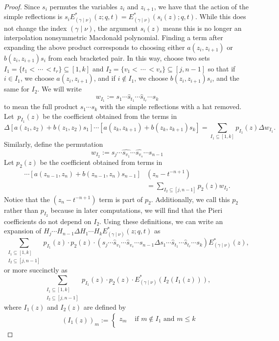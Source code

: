 \documentclass[11pt]{article}
\theoremstyle{definition}
\numberwithin{equation}{section}
\newcommand{\shatproduct}{s_1 \dotsm \widehat{s}_{t_1} \dotsm \widehat{s}_{t_r} \dotsm s_k}
\newcommand{\Estar}[1]{E^*_{#1}}
\newcommand{\Estarlong}[1]{E^*_{#1}(z;q,t)}
\newcommand{\gammanu}{{(\gamma \mid \nu)}}
\begin{document}
\begin{proof}
Since $s_i$ permutes the variables $z_i$ and $z_{i+1}$, we have that the action of the simple reflections is $s_i\Estarlong{\gammanu} = \Estar{\gammanu}(s_i(z);q,t)$. While this does not change the index $\gammanu$, the argument $s_i(z)$ means this is no longer an interpolation nonsymmetric Macdonald polynomial. Finding a term after expanding the above product corresponds to choosing either $a(z_i,z_{i+1})$ or $b(z_i,z_{i+1}) s_i$ from each bracketed pair. In this way, choose two sets $I_1=\{t_1< \, \dotsm \, < t_r\} \subseteq [1,k]$ and $I_2=\{v_1< \, \dotsm \, < v_s\} \subseteq [j,n-1]$ so that if $i\in I_1$, we choose $a(z_i,z_{i+1})$, and if $i\notin I_1$, we choose $b(z_i,z_{i+1})s_i$, and the same for $I_2$. We will write
\[ w_{I_1} := \shatproduct \]
to mean the full product $s_1 \dotsm s_k$ with the simple reflections with a hat removed. Let~$p_{I_1}(z)$ be the coefficient obtained from the terms in
\[ \Delta [a(z_1, z_2)+b(z_1,z_2) s_1] \dotsm [a(z_k,z_{k+1}) + b(z_k,z_{k+1})s_k] = \sum_{I_1\subseteq [1,k]} p_{I_1}(z) \Delta w_{I_1}.\]
Similarly, define the permutation
\[w_{I_2} := s_j \dotsm \widehat{s_{v_1}} \dotsm \widehat{s_{v_s}} \dotsm s_{n-1} \]
Let $p_{2}(z)$  be the coefficient obtained from terms in
\begin{align*} [a(z_j,z_{j+1})+b(z_j,z_{j+1}) s_j] \dotsm [a(z_{n-1},z_n)+b(z_{n-1},z_n) s_{n-1}] &(z_n-t^{-n+1})\\ &=\sum_{I_2\subseteq[j,n-1]}p_2(z)w_{I_2}.\end{align*}
Notice that the $(z_n-t^{-n+1})$ term is part of $p_2$. Additionally, we call this $p_2$ rather than $p_{I_2}$ because in later computations, we will find that the Pieri coefficients do not depend on $I_2$. Using these definitions, we can write an expansion of $\displaystyle{H_j \dotsm H_{n-1} \Delta H_1 \dotsm H_k  \Estarlong{\gammanu}}$ as
\begin{equation}\label{Expandedright}
      \sum\limits_{\substack{I_1 \subseteq [1,k] \\ I_2 \subseteq [j, n-1]}} p_{I_1}(z) \cdot p_2(z)  \cdot \left( s_j \dotsm \widehat{s}_{v_1} \dotsm \widehat{s}_{v_s} \dotsm s_{n-1}\Delta \shatproduct \right) \Estar{\gammanu}(z), \end{equation}
or more succinctly as
   \[ \sum\limits_{\substack{I_1 \subseteq [1,k] \\ I_2 \subseteq [j, n-1]}} p_{I_1}(z) \cdot p_2(z)  \cdot \Estar{\gammanu}(I_2(I_1(z))),
\]
where $I_1(z)$ and $I_2(z)$ are defined by
\begin{align} \label{Ione}&(I_1(z))_m := \begin{cases} z_m  &\text{ if } m\notin I_1 \text{ and } m \leq k \\

\end{cases}
\end{align}
\end{proof}
\end{document}
